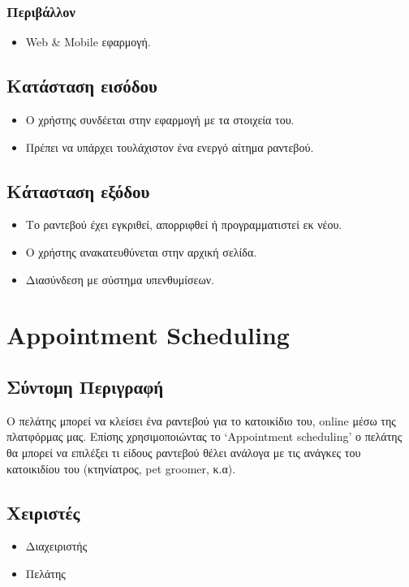 \documentclass[12pt,a4paper,twoside]{book}
\begin{document}
\subsubsection{Περιβάλλον}
\begin{itemize}
  \item Web \& Mobile εφαρμογή.
\end{itemize}

\subsection{Κατάσταση εισόδου} %
\begin{itemize}
  \item Ο χρήστης συνδέεται στην εφαρμογή με τα στοιχεία του. %
  \item Πρέπει να υπάρχει τουλάχιστον ένα ενεργό αίτημα ραντεβού.
\end{itemize}

\subsection{Κάτασταση εξόδου} %
\begin{itemize}
  \item Το ραντεβού έχει εγκριθεί, απορριφθεί ή προγραμματιστεί εκ νέου.
  \item Ο χρήστης ανακατευθύνεται στην αρχική σελίδα. %
\end{itemize}

\begin{itemize}
  \item Διασύνδεση με σύστημα υπενθυμίσεων. %
\end{itemize}

\section{Appointment Scheduling}

\subsection{Σύντομη Περιγραφή}
Ο πελάτης μπορεί να κλείσει ένα ραντεβού για το κατοικίδιο του, online μέσω της πλατφόρμας μας. Επίσης χρησιμοποιώντας το ‘Appointment scheduling’ ο πελάτης θα μπορεί να επιλέξει τι είδους ραντεβού θέλει ανάλογα με τις ανάγκες του κατοικιδίου του (κτηνίατρος, pet groomer, κ.α). %

\subsection{Χειριστές}
\begin{itemize}
  \item Διαχειριστής
  \item Πελάτης
\end{itemize}
\end{document}
